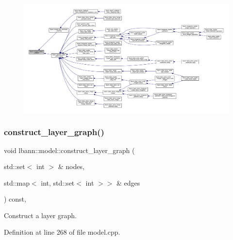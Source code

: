 \begin{figure}[H]
\begin{center}
\leavevmode
\includegraphics[width=350pt]{classlbann_1_1model_aa819e0d7c8bb178155e40e33037cf054_icgraph}
\end{center}
\end{figure}
\mbox{\label{classlbann_1_1model_aef7a4775c70f96610bfc5a4605b946a5}} 
\subsubsection{\texorpdfstring{construct\+\_\+layer\+\_\+graph()}{construct\_layer\_graph()}}
{\footnotesize\ttfamily void lbann\+::model\+::construct\+\_\+layer\+\_\+graph (\begin{DoxyParamCaption}\item[{std\+::set$<$ int $>$ \&}]{nodes,  }\item[{std\+::map$<$ int, std\+::set$<$ int $>$$>$ \&}]{edges }\end{DoxyParamCaption}) const\hspace{0.3cm}{\ttfamily [protected]}, {\ttfamily [virtual]}}

Construct a layer graph. 

Definition at line 268 of file model.\+cpp.


